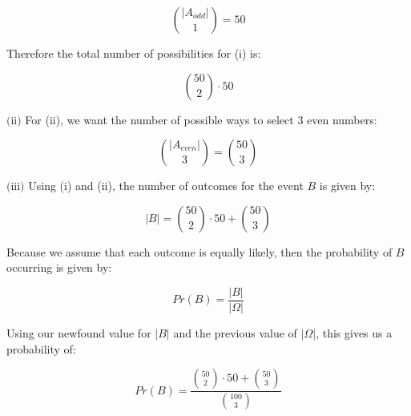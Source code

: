 \documentclass{article}
\newcommand{\subproblem}[1]{$\boxed{\text{(#1)}}$}
\newcommand{\solution}[1]{\boxed{#1}}
\begin{document}
\begin{multicols*}{2}
\[
\binom{|A_{odd}|}{1}=50
\]

Therefore the total number of possibilities for (i) is:

\[
\binom{50}{2}\cdot 50
\]

%
\subproblem{ii} For (ii), we want the number of possible ways to
select 3 even numbers:

\[
\binom{|A_{even}|}{3}=\binom{50}{3}
\]

%
\subproblem{iii} Using (i) and (ii), the number of outcomes for the
event $B$ is given by:

\[
|B|=\binom{50}{2}\cdot 50 + \binom{50}{3}
\]

Because we assume that each outcome is equally likely, then the
probability of $B$ occurring is given by:

\[
Pr(B)=\frac{|B|}{|\Omega|}
\]

Using our newfound value for $|B|$ and the previous value of
$|\Omega|$, this gives us a probability of:

\[
\solution{Pr(B)=\dfrac{\binom{50}{2}\cdot50+\binom{50}{3}}{\binom{100}{3}}}
\]


\end{multicols*}
\end{document}
